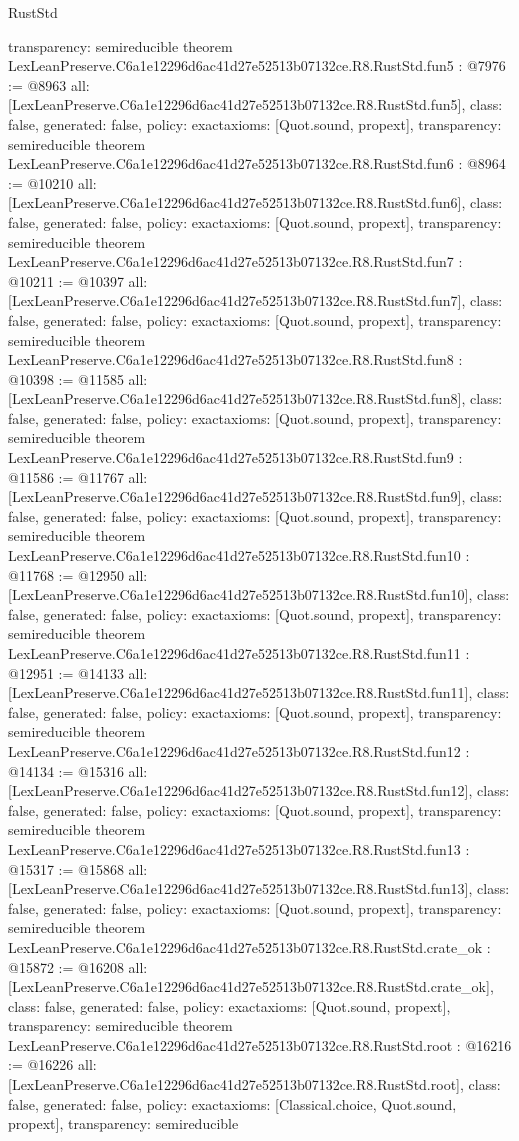 \begin{lexlean}{RustStd}
\begin{coremodule}
{  transparency: semireducible
}
theorem LexLeanPreserve.C6a1e12296d6ac41d27e52513b07132ce.R8.RustStd.fun5 : @7976 := @8963 {
  all: [LexLeanPreserve.C6a1e12296d6ac41d27e52513b07132ce.R8.RustStd.fun5],
  class: false,
  generated: false,
  policy: exact{axioms: [Quot.sound, propext]},
  transparency: semireducible
}
theorem LexLeanPreserve.C6a1e12296d6ac41d27e52513b07132ce.R8.RustStd.fun6 : @8964 := @10210 {
  all: [LexLeanPreserve.C6a1e12296d6ac41d27e52513b07132ce.R8.RustStd.fun6],
  class: false,
  generated: false,
  policy: exact{axioms: [Quot.sound, propext]},
  transparency: semireducible
}
theorem LexLeanPreserve.C6a1e12296d6ac41d27e52513b07132ce.R8.RustStd.fun7 : @10211 := @10397 {
  all: [LexLeanPreserve.C6a1e12296d6ac41d27e52513b07132ce.R8.RustStd.fun7],
  class: false,
  generated: false,
  policy: exact{axioms: [Quot.sound, propext]},
  transparency: semireducible
}
theorem LexLeanPreserve.C6a1e12296d6ac41d27e52513b07132ce.R8.RustStd.fun8 : @10398 := @11585 {
  all: [LexLeanPreserve.C6a1e12296d6ac41d27e52513b07132ce.R8.RustStd.fun8],
  class: false,
  generated: false,
  policy: exact{axioms: [Quot.sound, propext]},
  transparency: semireducible
}
theorem LexLeanPreserve.C6a1e12296d6ac41d27e52513b07132ce.R8.RustStd.fun9 : @11586 := @11767 {
  all: [LexLeanPreserve.C6a1e12296d6ac41d27e52513b07132ce.R8.RustStd.fun9],
  class: false,
  generated: false,
  policy: exact{axioms: [Quot.sound, propext]},
  transparency: semireducible
}
theorem LexLeanPreserve.C6a1e12296d6ac41d27e52513b07132ce.R8.RustStd.fun10 : @11768 := @12950 {
  all: [LexLeanPreserve.C6a1e12296d6ac41d27e52513b07132ce.R8.RustStd.fun10],
  class: false,
  generated: false,
  policy: exact{axioms: [Quot.sound, propext]},
  transparency: semireducible
}
theorem LexLeanPreserve.C6a1e12296d6ac41d27e52513b07132ce.R8.RustStd.fun11 : @12951 := @14133 {
  all: [LexLeanPreserve.C6a1e12296d6ac41d27e52513b07132ce.R8.RustStd.fun11],
  class: false,
  generated: false,
  policy: exact{axioms: [Quot.sound, propext]},
  transparency: semireducible
}
theorem LexLeanPreserve.C6a1e12296d6ac41d27e52513b07132ce.R8.RustStd.fun12 : @14134 := @15316 {
  all: [LexLeanPreserve.C6a1e12296d6ac41d27e52513b07132ce.R8.RustStd.fun12],
  class: false,
  generated: false,
  policy: exact{axioms: [Quot.sound, propext]},
  transparency: semireducible
}
theorem LexLeanPreserve.C6a1e12296d6ac41d27e52513b07132ce.R8.RustStd.fun13 : @15317 := @15868 {
  all: [LexLeanPreserve.C6a1e12296d6ac41d27e52513b07132ce.R8.RustStd.fun13],
  class: false,
  generated: false,
  policy: exact{axioms: [Quot.sound, propext]},
  transparency: semireducible
}
theorem LexLeanPreserve.C6a1e12296d6ac41d27e52513b07132ce.R8.RustStd.crate_ok : @15872 := @16208 {
  all: [LexLeanPreserve.C6a1e12296d6ac41d27e52513b07132ce.R8.RustStd.crate_ok],
  class: false,
  generated: false,
  policy: exact{axioms: [Quot.sound, propext]},
  transparency: semireducible
}
theorem LexLeanPreserve.C6a1e12296d6ac41d27e52513b07132ce.R8.RustStd.root : @16216 := @16226 {
  all: [LexLeanPreserve.C6a1e12296d6ac41d27e52513b07132ce.R8.RustStd.root],
  class: false,
  generated: false,
  policy: exact{axioms: [Classical.choice, Quot.sound, propext]},
  transparency: semireducible
}


\end{coremodule}
\end{lexlean}
